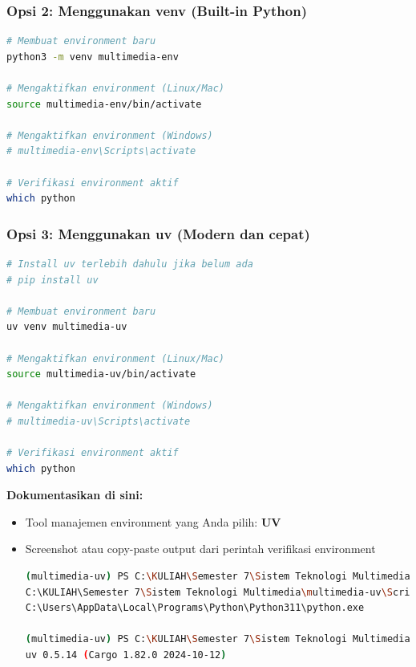 \documentclass[11pt,a4paper]{article}
\begin{document}
\subsubsection{Opsi 2: Menggunakan venv (Built-in Python)}
\begin{lstlisting}[language=bash, caption=Membuat environment dengan venv]
# Membuat environment baru
python3 -m venv multimedia-env

# Mengaktifkan environment (Linux/Mac)
source multimedia-env/bin/activate

# Mengaktifkan environment (Windows)
# multimedia-env\Scripts\activate

# Verifikasi environment aktif
which python
\end{lstlisting}

\subsubsection{Opsi 3: Menggunakan uv (Modern dan cepat)}
\begin{lstlisting}[language=bash, caption=Membuat environment dengan uv]
# Install uv terlebih dahulu jika belum ada
# pip install uv

# Membuat environment baru
uv venv multimedia-uv

# Mengaktifkan environment (Linux/Mac)
source multimedia-uv/bin/activate

# Mengaktifkan environment (Windows)
# multimedia-uv\Scripts\activate

# Verifikasi environment aktif
which python
\end{lstlisting}

\textbf{Dokumentasikan di sini:}
\begin{itemize}
    \item Tool manajemen environment yang Anda pilih: \textbf{UV}
    \item Screenshot atau copy-paste output dari perintah verifikasi environment
    
    \begin{lstlisting}[language=bash, caption=Output verifikasi environment uv]
(multimedia-uv) PS C:\KULIAH\Semester 7\Sistem Teknologi Multimedia> where python
C:\KULIAH\Semester 7\Sistem Teknologi Multimedia\multimedia-uv\Scripts\python.exe
C:\Users\AppData\Local\Programs\Python\Python311\python.exe

(multimedia-uv) PS C:\KULIAH\Semester 7\Sistem Teknologi Multimedia> uv --version
uv 0.5.14 (Cargo 1.82.0 2024-10-12)
    \end{lstlisting}
\end{itemize}
\end{document}
